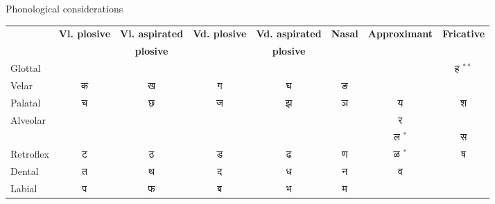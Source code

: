 \documentclass[final]{beamer}
\newlength{\twocolwid}
\begin{document}
\begin{frame}[t]
\begin{columns}[t]
\begin{column}{\twocolwid}
\begin{block}{Phonological considerations}
\begin{itemize}
                    \end{itemize}
                    
                \end{block} %
                
                    
	                \begin{table}[ht]
                        \centering
                        
                        \begin{center}
                            \begin{tabular}{|l|c|c|c|c|c|c|c|}
                                
                                \hline
                                & \textbf{Vl. plosive }&\textbf{Vl. aspirated }&\textbf{Vd. plosive }
                                &\textbf{Vd. aspirated }&\textbf{Nasal}&
                                \textbf{Approximant}&\multicolumn{1}{c|}{\textbf{Fricative}}\\
                                & \textbf{}&\textbf{ plosive}&\textbf{ }&\textbf{ plosive}&\textbf{}&&
                                \\
                                
                                \hline
                                Glottal&&&&&&&ह \quad  [ɦə]$^{**}$\\	\hline
                                Velar&क \quad[kə]	&ख \quad [kʰə]&	ग \quad [gə]&	घ \quad [gʰə]& ङ \quad [ŋə]&&\\\hline
                                Palatal& च \quad [t͡ɕə]&	छ \quad  [t͡ɕʰə]& ज \quad  [d͡ʑə]&	झ \quad  [d͡ʑʱə]& ञ \quad  [ɲə]&य \quad  [jə]&
                                \multirow{2}{*}{श \quad  [ɕə]}\\\cline{1-7}
                                \multirow{2}{*}{Alveolar}&&&&&&र \quad  [ɹə]&\\\cline{8-8}
                                &&&&&&ल  \quad [lə]$^*$&स \quad  [sə]\\\hline
                                Retroflex& ट \quad  [ʈə]&	ठ \quad  [ʈʰə]& 	ड \quad  [ɖə]& ढ \quad  [ɖʰə]&	ण \quad  [ɳə]&ळ \quad  [ɭə]$^*$&ष \quad  [ʂə]\\\hline
                                Dental& त \quad  [t̪ə]& 	थ \quad  [t̪ʰə]&	द \quad  [d̪ə]&		ध \quad  [d̪ʰə]& न \quad  [nə]&\multirow{2}{*}{व \quad  [ʋə]}&\\\cline{1-6}\cline{8-8}
                                Labial & प \quad  [pə]& 	फ \quad  [pʰə]& ब \quad  [bə]& 	भ \quad  [bʱə]& म \quad  [mə]&&\\\hline
                                

\end{tabular}
\end{center}
\end{table}
\end{column}
\end{columns}
\end{frame}
\end{document}
